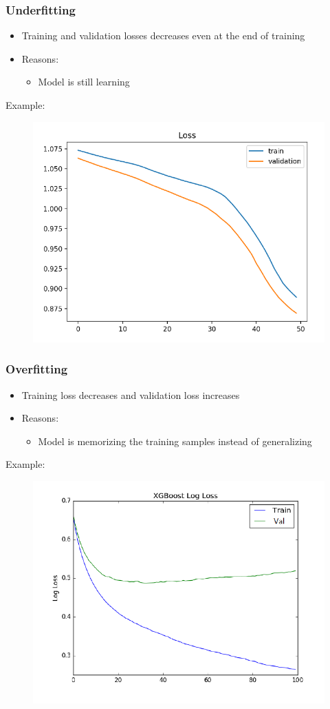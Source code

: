 \documentclass[10pt,a4paper]{article}
\begin{document}
\subsubsection{Underfitting}
\begin{itemize}
	\item Training and validation losses decreases even at the end of training
	\item Reasons:
	\begin{itemize}
		\item Model is still learning
	\end{itemize}
\end{itemize}

Example:
\begin{figure}[H]
	\includegraphics[width=0.5\columnwidth]{figures/graph_underfitting.png}
\end{figure}

\subsubsection{Overfitting}
\begin{itemize}
	\item Training loss decreases and validation loss increases
	\item Reasons:
	\begin{itemize}
		\item Model is memorizing the training samples instead of generalizing
	\end{itemize}
\end{itemize}

Example:
\begin{figure}[H]
	\includegraphics[width=0.5\columnwidth]{figures/graph_overfitting.png}
\end{figure}
\end{document}
